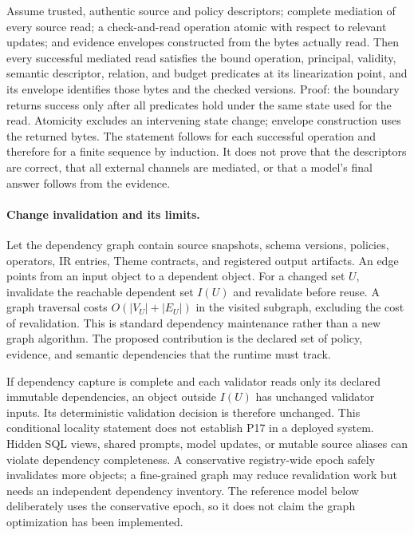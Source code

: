 \begin{proposition}
Assume trusted, authentic source and policy descriptors; complete mediation of every source read; a check-and-read operation atomic with respect to relevant updates; and evidence envelopes constructed from the bytes actually read. Then every successful mediated read satisfies the bound operation, principal, validity, semantic descriptor, relation, and budget predicates at its linearization point, and its envelope identifies those bytes and the checked versions. Proof: the boundary returns success only after all predicates hold under the same state used for the read. Atomicity excludes an intervening state change; envelope construction uses the returned bytes. The statement follows for each successful operation and therefore for a finite sequence by induction. It does not prove that the descriptors are correct, that all external channels are mediated, or that a model's final answer follows from the evidence.
\end{proposition}

\paragraph{Change invalidation and its limits.}
Let the dependency graph contain source snapshots, schema versions, policies, operators, IR entries, Theme contracts, and registered output artifacts. An edge points from an input object to a dependent object. For a changed set $U$, invalidate the reachable dependent set $I(U)$ and revalidate before reuse. A graph traversal costs $O(|V_U|+|E_U|)$ in the visited subgraph, excluding the cost of revalidation. This is standard dependency maintenance rather than a new graph algorithm. The proposed contribution is the declared set of policy, evidence, and semantic dependencies that the runtime must track.

If dependency capture is complete and each validator reads only its declared immutable dependencies, an object outside $I(U)$ has unchanged validator inputs. Its deterministic validation decision is therefore unchanged. This conditional locality statement does not establish P17 in a deployed system. Hidden SQL views, shared prompts, model updates, or mutable source aliases can violate dependency completeness. A conservative registry-wide epoch safely invalidates more objects; a fine-grained graph may reduce revalidation work but needs an independent dependency inventory. The reference model below deliberately uses the conservative epoch, so it does not claim the graph optimization has been implemented.

